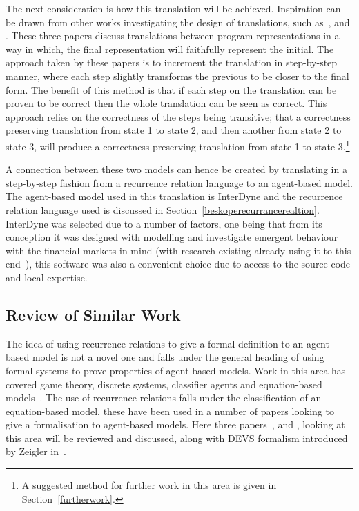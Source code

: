 \documentclass{article}
\begin{document}
The next consideration is how this translation will be achieved. Inspiration can be drawn from other works investigating the design of translations, such as~\cite{clovertrans},  \cite{transproggotmod} and  \cite{stepcorentconv}. These three papers discuss translations between program representations in a way in which, the final representation will faithfully represent the initial. The approach taken by these papers is to increment the translation in step-by-step manner, where each step slightly transforms the previous to be closer to the final form. The benefit of this method is that if each step on the translation can be proven to be correct then the whole translation can be seen as correct. This approach relies on the correctness of the steps being transitive; that a correctness preserving translation from state 1 to state 2, and then another from state 2 to state 3, will produce a correctness preserving translation from state 1 to state 3.\footnote{A suggested method for further work in this area is given in Section~\ref{furtherwork}.} 

A connection between these two models can hence be created by translating in a step-by-step fashion from a recurrence relation language to an agent-based model. The agent-based model used in this translation is InterDyne and the recurrence relation language used is discussed in Section~\ref{beskoperecurrancerealtion}. InterDyne was selected due to a number of factors, one being that from its conception it was designed with modelling and investigate emergent behaviour with the financial markets in mind (with research existing already using it to this end~\cite{DynamicCoupling_Chris}), this software was also a convenient choice due to access to the source code and local expertise.

\subsection{Review of Similar Work}\label{simwork}
The idea of using recurrence relations to give a formal definition to an agent-based model is not a novel one and falls under the general heading of using formal systems to prove properties of agent-based models. Work in this area has covered game theory, discrete systems, classifier agents and equation-based models~\cite{taabm}. The use of recurrence relations falls under the classification of an equation-based model, these have been used in a number of papers looking to give a formalisation to agent-based models. Here three papers~\cite{ebmabmi}, \cite{econmistsnoabm} and \cite{abmtsd}, looking at this area will be reviewed and discussed, along with DEVS formalism introduced by Zeigler in~\cite{introdevs}.
\end{document}
